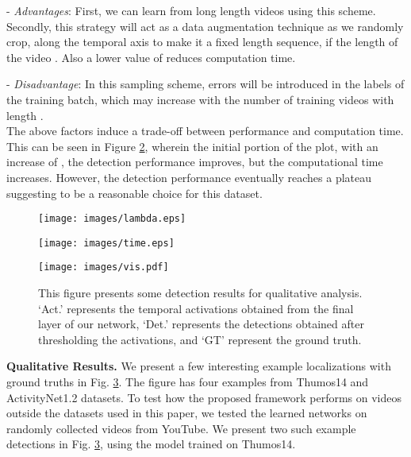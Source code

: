 \documentclass[runningheads]{llncs}
\begin{document}
\noindent
- \textit{Advantages}: First, we can learn from long length videos using this scheme. Secondly, this strategy will act as a data augmentation technique as we randomly crop, along the temporal axis to make it a fixed length sequence, if the length of the video . Also a lower value of  reduces computation time.

\noindent
- \textit{Disadvantage}: In this sampling scheme, errors will be introduced in the labels of the training batch, which may increase with the number of training videos with length . \\
The above factors induce a trade-off between performance and computation time. This can be seen in Figure \ref{time}, wherein the initial portion of the plot, with an increase of , the detection performance improves, but the computational time increases. However, the detection performance eventually reaches a plateau suggesting  to be a reasonable choice for this dataset.

\begin{figure*}
	\centering
	\begin{subfigure}{0.48\textwidth}
		\texttt{[image: images/lambda.eps]}
		\caption{}
		\label{lambda}
	\end{subfigure}
	\begin{subfigure}{0.48\textwidth}
		\texttt{[image: images/time.eps]}
		\caption{}
		\label{time}
	\end{subfigure}
	\caption{(a) presents the variations in detection performance on Thumos14 by changing weights on MILL and CASL. Higher  represents more weight on the MILL and vice versa. (b) presents the variations in detection performance () and training time on Thumos14 dataset by changing the maximum possible length of video sequence during training () as discussed in the text.}
	\label{expanalysis}
\end{figure*}

\begin{figure}[!t]
	\centering
\texttt{[image: images/vis.pdf]}
	\caption{This figure presents some detection results for qualitative analysis. `Act.' represents the temporal activations obtained from the final layer of our network, `Det.' represents the detections obtained after thresholding the activations, and `GT' represent the ground truth. }
	\label{vis}
\end{figure}

\textbf{Qualitative Results.} We present a few interesting example localizations with ground truths in Fig. \ref{vis}. The figure has four examples from Thumos14 and ActivityNet1.2 datasets. To test how the proposed framework performs on videos outside the datasets used in this paper, we tested the learned networks on randomly collected videos from YouTube. We present two such example detections in Fig. \ref{vis}, using the model trained on Thumos14. 
\end{document}
